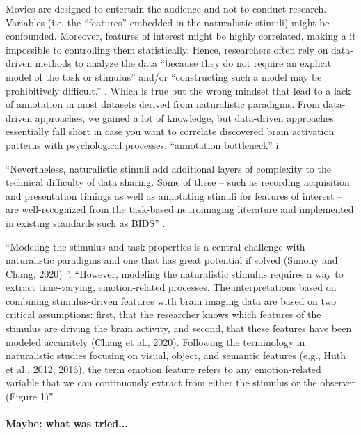 %
Movies are designed to entertain the audience and not to conduct research.
%
Variables (i.e. the ``features'' embedded in the naturalistic stimuli) might be
confounded.
%
Moreover, features of interest might be highly correlated, making a it
impossible to controlling them statistically.
%
Hence, researchers often rely on data-driven methods to analyze the data
``because they do not require an explicit model of the task or stimulus'' and/or
``constructing such a model may be prohibitively difficult.''
\citep{nastase2019measuring}.
%
Which is true but the wrong mindset that lead to a lack of annotation in most
datasets derived from naturalistic paradigms.
%
From data-driven approaches, we gained a lot of knowledge, but data-driven
approaches essentially fall short in case you want to correlate discovered brain
activation patterns with psychological processes.
%
``annotation bottleneck'' \citep{aliko2020naturalistic}i.

``Nevertheless, naturalistic stimuli add additional layers of complexity to the
technical difficulty of data sharing. Some of these – such as recording
acquisition and presentation timings as well as annotating stimuli for features
of interest – are well-recognized from the task-based neuroimaging literature
and implemented in existing standards such as BIDS'' \citep{dupre2020nature}.

``Modeling the stimulus and task properties is a central challenge with
naturalistic paradigms and one that has great potential if solved (Simony and
Chang, 2020) \citep{saarimaki2021naturalistic}''.
%
``However, modeling the naturalistic stimulus requires a way to extract
time-varying, emotion-related processes. The interpretations based on combining
stimulus-driven features with brain imaging data are based on two critical
assumptions: first, that the researcher knows which features of the stimulus are
driving the brain activity, and second, that these features have been modeled
accurately (Chang et al., 2020). Following the terminology in naturalistic
studies focusing on visual, object, and semantic features (e.g., Huth et al.,
2012, 2016), the term emotion feature refers to any emotion-related variable
that we can continuously extract from either the stimulus or the observer
(Figure 1)'' \citep{saarimaki2021naturalistic}.


\paragraph{Maybe: what was tried...}

